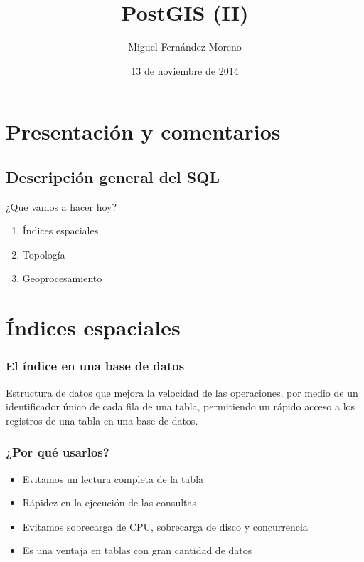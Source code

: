 \documentclass{classes/beamer_GeomaticaUA}
\author{Miguel Fernández Moreno}
\title{PostGIS (II)}
\institute[GeomaticaLab]{Instituto Interuniversitario de Geografía\\Laboratorio de Geomática}
\date{13 de noviembre de 2014}
\begin{document}
\begin{frame}
\titlepage
\end{frame}

\section[Introducción]{Presentación y comentarios}
\subsection{Descripción general del SQL}
\begin{frame}{¿Que vamos a hacer hoy?}
\begin{enumerate}
\item Índices espaciales
\item Topología
\item Geoprocesamiento
\end{enumerate}
\end{frame}


\section[Índices]{Índices espaciales}

\begin{frame}[fragile]
\frametitle{El índice en una base de datos}
Estructura de datos que mejora la velocidad de las operaciones, por medio de un identificador único de cada fila de una tabla, permitiendo un rápido acceso a los registros de una tabla en una base de datos. 
\end{frame}

\begin{frame}[fragile]
\frametitle{¿Por qué usarlos?}
\begin{itemize}
\item Evitamos un lectura completa de la tabla
\item Rápidez en la ejecución de las consultas
\item Evitamos sobrecarga de CPU, sobrecarga de disco y concurrencia
\item Es una ventaja en tablas con gran cantidad de datos
\end{itemize}
\end{frame}
\end{document}
